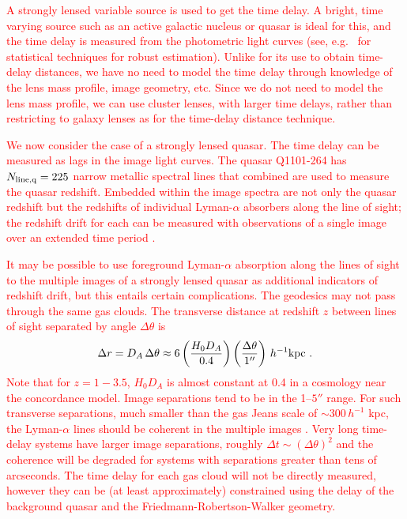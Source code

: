 \documentclass[preprint2, 10pt]{aastex}
\newcommand{\be}{\begin{equation}}
\newcommand{\ee}{\end{equation}}
\begin{document}
\textcolor{red}{
A strongly lensed variable source is used to get the time delay. A bright, time varying source 
such as an active galactic nucleus or quasar is ideal for this, and the time delay is measured from 
the photometric light curves (see, e.g.\ \citet{tewes,hkl} for statistical 
techniques for robust estimation).
Unlike for its use to obtain time-delay distances, 
we have no need to model the time delay through knowledge of the lens mass 
profile, image geometry, etc.
Since we do not need to model the lens mass profile, we can 
use cluster lenses, with larger time delays, rather than restricting to 
galaxy lenses as for the time-delay distance technique. }


\textcolor{red}{
We now consider the case of a strongly lensed quasar.  The time delay can
be measured as lags in the image light curves.  The quasar Q1101-264  has
$N_{\rm line,q} =225$ narrow metallic spectral lines 
\citep{2008MNRAS.386.1192L} that combined are used to measure the quasar
redshift.  Embedded within the image spectra are not only the quasar redshift but 
the redshifts of individual Lyman-$\alpha$ absorbers along the line of sight; the redshift drift for each can
be measured 
with observations of a single image
over an extended time period
\citep{1998ApJ...499L.111L,2008MNRAS.386.1192L}.}

\textcolor{red}{It may be possible to use 
foreground Lyman-$\alpha$ absorption along the lines of sight to the multiple images 
of a strongly lensed quasar as additional indicators of redshift drift, 
but this entails certain complications.
The geodesics may not pass through the same gas clouds.
The transverse distance at redshift $z$ between 
lines of sight separated by angle $\Delta\theta$ is 
\be 
\Delta r=D_A\,\Delta\theta\approx 
6\left(\frac{H_0D_A}{0.4}\right)\left(\frac{\Delta\theta}{1''}\right)\, 
h^{-1}{\rm kpc} \ . 
\ee 
Note that for $z=1-3.5$, $H_0D_A$ is almost constant at 0.4 in a 
cosmology near the concordance model.  Image separations tend to be in 
the 1--$5''$ range.  For such transverse separations, much smaller than 
the gas Jeans scale of $\sim300\,h^{-1}$ kpc, the Lyman-$\alpha$ lines 
should be coherent in the multiple images \citep{09100250}.  
Very long time-delay systems have larger image separations, roughly 
$\Delta t\sim(\Delta\theta)^2$ and the coherence will be degraded for 
systems with separations greater than tens of arcseconds. 
The time delay for each gas cloud will not be directly measured, however they
can be (at least approximately) constrained using the delay
of the background quasar and the Friedmann-Robertson-Walker geometry. 
}
\end{document}
